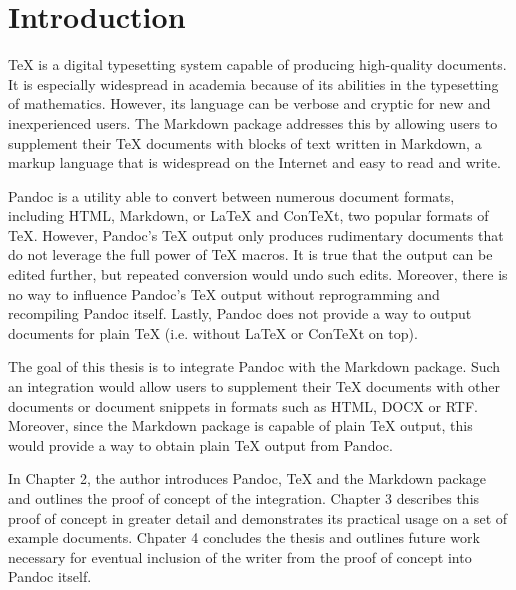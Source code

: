 \documentclass[
  digital,     %
  oneside,     %
  nosansbold,  %
  nocolorbold, %
  lof,         %
  nolot,       %
]{fithesis4}
\begin{document}

\chapter{Introduction}
\TeX{} is a digital typesetting system capable of producing high-quality documents. It is especially widespread in academia because of its abilities in the typesetting of mathematics. However, its language can be verbose and cryptic for new and inexperienced users. The Markdown package addresses this by allowing users to supplement their \TeX{} documents with blocks of text written in Markdown, a markup language that is widespread on the Internet and easy to read and write.

Pandoc is a utility able to convert between numerous document formats, including HTML, Markdown, or \LaTeX{} and Con\TeX{}t, two popular formats of \TeX{}. However, Pandoc's \TeX{} output only produces rudimentary documents that do not leverage the full power of \TeX{} macros. It is true that the output can be edited further, but repeated conversion would undo such edits.
Moreover, there is no way to influence Pandoc's \TeX{} output without reprogramming and recompiling Pandoc itself.
Lastly, Pandoc does not provide a way to output documents for plain \TeX{} (i.e. without \LaTeX{} or Con\TeX{}t on top).

The goal of this thesis is to integrate Pandoc with the Markdown package. Such an integration would allow users to supplement their \TeX{} documents with other documents or document snippets in formats such as HTML, DOCX or RTF. Moreover, since the Markdown package is capable of plain \TeX{} output, this would provide a way to obtain plain \TeX{} output from Pandoc.

In Chapter 2, the author introduces Pandoc, \TeX{} and the Markdown package and outlines the proof of concept of the integration. Chapter 3 describes this proof of concept in greater detail and demonstrates its practical usage on a set of example documents. Chpater 4 concludes the thesis and outlines future work necessary for eventual inclusion of the writer from the proof of concept into Pandoc itself.
\end{document}
